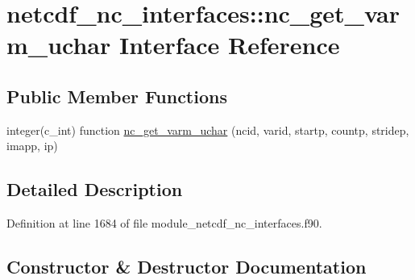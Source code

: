 \hypertarget{interfacenetcdf__nc__interfaces_1_1nc__get__varm__uchar}{}\section{netcdf\+\_\+nc\+\_\+interfaces\+:\+:nc\+\_\+get\+\_\+varm\+\_\+uchar Interface Reference}
\label{interfacenetcdf__nc__interfaces_1_1nc__get__varm__uchar}
\subsection*{Public Member Functions}
\begin{DoxyCompactItemize}
\item 
integer(c\+\_\+int) function \hyperlink{interfacenetcdf__nc__interfaces_1_1nc__get__varm__uchar_a355225be897514d76d03d2052a58b628}{nc\+\_\+get\+\_\+varm\+\_\+uchar} (ncid, varid, startp, countp, stridep, imapp, ip)
\end{DoxyCompactItemize}


\subsection{Detailed Description}


Definition at line 1684 of file module\+\_\+netcdf\+\_\+nc\+\_\+interfaces.\+f90.



\subsection{Constructor \& Destructor Documentation}
\mbox{\label{interfacenetcdf__nc__interfaces_1_1nc__get__varm__uchar_a355225be897514d76d03d2052a58b628}} 
